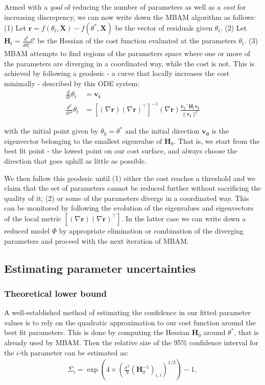 \documentclass[10pt]{amsart}
\begin{document}
Armed with a \textit{goal} of reducing the number of parameters as well as a \textit{cost} for increasing discrepency, we can now write down the MBAM algorithm as follows: 
(1) Let $\mathbf{r} = f(\theta_t, \mathbf{X}) - f(\theta^*, \mathbf{X})$ be the vector of residuals given $\theta_t$. 
(2) Let $\mathbf{H}_t = \frac{d^2}{d\theta_t^2}\mathcal{C}$ be the Hessian of the cost function evaluated at the parameters $\theta_t$.
(3) MBAM attempts to find regions of the parameters space where one or more of the parameters are diverging in a coordinated way, while the cost is not. This is achieved by following a geodesic - a curve that locally increases the cost minimally - described by this ODE system:
	\begin{align}
		\frac{d}{d\tau}\theta_t&=\mathbf{v_t} \\
		\frac{d^2}{d\tau^2}\theta_t&=[(\nabla \mathbf{r}) (\nabla \mathbf{r})^\top]^{-1} (\nabla \mathbf{r}) \frac{\mathbf{v_t}^\top \mathbf{H}_t \mathbf{v_t}}{\|\mathbf{v_t}\|^2}
	\end{align}

	with the initial point given by $\theta_0 = \theta^*$ and the initial direction $\mathbf{v_0}$ is the eigenvector belonging to the smallest eigenvalue of $\mathbf{H}_0$. That is, we start from the best fit point - the lowest point on our cost surface, and always choose the direction that goes uphill as little as possible.

	We then follow this geodesic until (1) either the cost reaches a threshold and we claim that the set of parameters cannot be reduced further without sacrificing the quality of it; (2) or some of the parameters diverge in a coordinated way. This can be monitored by following the evolution of the eigenvalues and eigenvectors of the local metric $[(\nabla \mathbf{r}) (\nabla \mathbf{r})^\top]$. In the latter case we can write down a reduced model $\Phi$ by appropriate elimination or combination of the diverging parameters and proceed with the next iteration of MBAM.

	\subsection{Estimating parameter uncertainties}
	\subsubsection{Theoretical lower bound}
	A well-established method of estimating the confidence in our fitted parameter values is to rely on the quadratic approximation to our cost function around the best fit parameters. This is done by computing the Hessian $\mathbf{H}_0$ around $\theta^*$, that is already used by MBAM. Then the relative size of the 95\% confidence interval for the $i$-th parameter can be estimated as:
	\begin{align}
		\Sigma_i = \exp\left(4\times\left(\frac{\sigma^2}{N}\left(\mathbf{H}_0^{-1}\right)_{i,i}\right)^{1/2}\right) - 1,
	\end{align}
\end{document}

